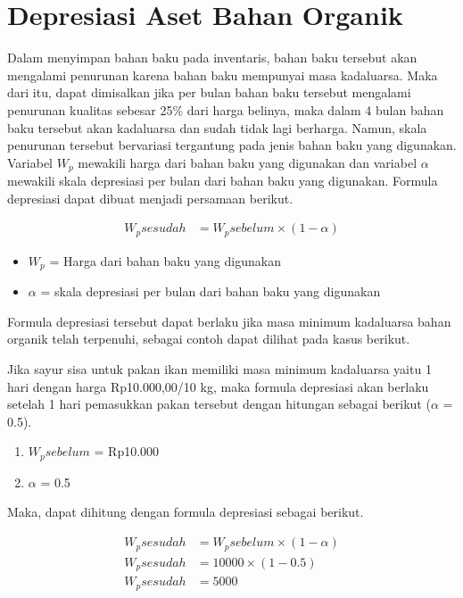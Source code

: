 \section{Depresiasi Aset Bahan Organik}

Dalam menyimpan bahan baku pada inventaris, bahan baku tersebut akan mengalami penurunan karena bahan baku mempunyai masa kadaluarsa. Maka dari itu, dapat dimisalkan jika per bulan bahan baku tersebut mengalami penurunan kualitas sebesar 25\% dari harga belinya, maka dalam 4 bulan bahan baku tersebut akan kadaluarsa dan sudah tidak lagi berharga. Namun, skala penurunan tersebut bervariasi tergantung pada jenis bahan baku yang digunakan. Variabel $W_p$ mewakili harga dari bahan baku yang digunakan dan variabel $\alpha$ mewakili skala depresiasi per bulan dari bahan baku yang digunakan. Formula depresiasi dapat dibuat menjadi persamaan berikut.

\begin{equation}
    \begin{split}
		W_psesudah
		&= W_psebelum\times(1 - \alpha)
    \end{split}
\end{equation}

\begin{itemize}
	\item $W_p$ = Harga dari bahan baku yang digunakan
	\item $\alpha$ = skala depresiasi per bulan dari bahan baku yang digunakan
\end{itemize}

Formula depresiasi tersebut dapat berlaku jika masa minimum kadaluarsa bahan organik telah terpenuhi, sebagai contoh dapat dilihat pada kasus berikut.

Jika sayur sisa untuk pakan ikan memiliki masa minimum kadaluarsa yaitu 1 hari dengan harga Rp10.000,00/10 kg, maka formula depresiasi akan berlaku setelah 1 hari pemasukkan pakan tersebut dengan hitungan sebagai berikut ($\alpha$ = 0.5).

\begin{enumerate}
	\item $W_psebelum$ = Rp10.000
	\item $\alpha$ = 0.5
\end{enumerate}

Maka, dapat dihitung dengan formula depresiasi sebagai berikut.

\begin{equation*}
	\begin{aligned}
	W_psesudah &= W_psebelum\times(1 - \alpha)\\
	W_psesudah &= 10000\times(1 - 0.5)\\
	W_psesudah &= 5000
	\end{aligned}
\end{equation*}

